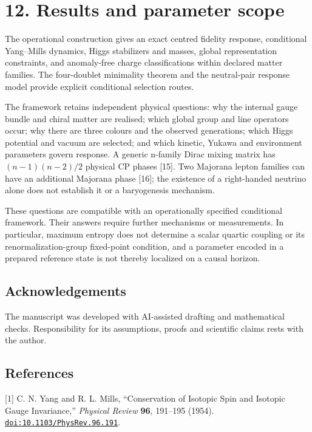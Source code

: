 \documentclass[
  11pt,
  a4paper,
]{article}
\begin{document}
\section{12. Results and parameter scope}\label{results-and-parameter-scope}

The operational construction gives an exact centred fidelity response, conditional Yang--Mills dynamics, Higgs stabilizers and masses, global representation constraints, and anomaly-free charge classifications within declared matter families. The four-doublet minimality theorem and the neutral-pair response model provide explicit conditional selection routes.

The framework retains independent physical questions: why the internal gauge bundle and chiral matter are realised; which global group and line operators occur; why there are three colours and the observed generations; which Higgs potential and vacuum are selected; and which kinetic, Yukawa and environment parameters govern response. A generic n-family Dirac mixing matrix has \((n-1)(n-2)/2\) physical CP phases {[}15{]}. Two Majorana lepton families can have an additional Majorana phase {[}16{]}; the existence of a right-handed neutrino alone does not establish it or a baryogenesis mechanism.

These questions are compatible with an operationally specified conditional framework. Their answers require further mechanisms or measurements. In particular, maximum entropy does not determine a scalar quartic coupling or its renormalization-group fixed-point condition, and a parameter encoded in a prepared reference state is not thereby localized on a causal horizon.

\subsection{Acknowledgements}\label{acknowledgements}

The manuscript was developed with AI-assisted drafting and mathematical checks. Responsibility for its assumptions, proofs and scientific claims rests with the author.

\subsection{References}\label{references}

{[}1{]} C. N. Yang and R. L. Mills, ``Conservation of Isotopic Spin and Isotopic Gauge Invariance,'' \emph{Physical Review} \textbf{96}, 191--195 (1954). \href{https://doi.org/10.1103/PhysRev.96.191}{\nolinkurl{doi:10.1103/PhysRev.96.191}}.
\end{document}
